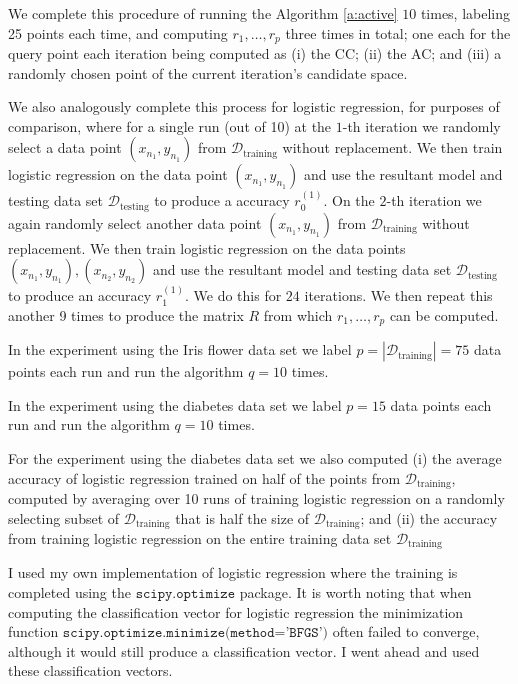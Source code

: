 \documentclass[11pt]{amsart}
\theoremstyle{definition}
\theoremstyle{remark}
\begin{document}
        We complete this procedure of running the Algorithm \ref{a:active} $10$ times, labeling 25 points each time, and computing $r_1, \dots, r_p$ three times in total; one each for the query point each iteration being computed as (i) the CC; (ii) the AC; and (iii) a randomly chosen point of the current iteration's candidate space. 

        We also analogously complete this process for logistic regression, for purposes of comparison, where for a single run (out of 10) at the $1$-th iteration we randomly select a data point $(x_{n_1}, y_{n_1})$ from $\mathcal{D}_\text{training}$ without replacement. We then train logistic regression on the data point $(x_{n_1}, y_{n_1})$ and use the resultant model and testing data set $\mathcal{D}_\text{testing}$ to produce a accuracy $r_0^{(1)}$. On the $2$-th iteration we again randomly select another data point $(x_{n_1}, y_{n_1})$ from $\mathcal{D}_\text{training}$ without replacement. We then train logistic regression on the data points $(x_{n_1}, y_{n_1}), (x_{n_2}, y_{n_2})$ and use the resultant model and testing data set $\mathcal{D}_\text{testing}$ to produce an accuracy $r_1^{(1)}$. We do this for $24$ iterations. We then repeat this another 9 times to produce the matrix $R$ from which $r_1, \dots, r_p$ can be computed.

        In the experiment using the Iris flower data set we label $p = |\mathcal{D}_\text{training}| = 75$ data points each run and run the algorithm $q = 10$ times. 

        In the experiment using the diabetes data set we label $p = 15$ data points each run and run the algorithm $q = 10$ times. 

        For the experiment using the diabetes data set we also computed (i) the average accuracy of logistic regression trained on half of the points from $\mathcal{D}_\text{training}$, computed by averaging over 10 runs of training logistic regression on a randomly selecting subset of $\mathcal{D}_\text{training}$ that is half the size of $\mathcal{D}_\text{training}$; and (ii) the accuracy from training logistic regression on the entire training data set $\mathcal{D}_\text{training}$

        I used my own implementation of logistic regression where the training is completed using the $\texttt{scipy.optimize}$ package. It is worth noting that when computing the classification vector for logistic regression the minimization function $\texttt{scipy.optimize.minimize(method='BFGS')}$ often failed to converge, although it would still produce a classification vector. I went ahead and used these classification vectors.
\end{document}
